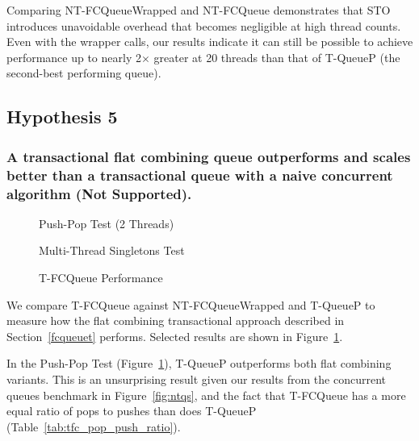 Comparing NT-FCQueueWrapped and NT-FCQueue demonstrates that STO introduces unavoidable overhead that becomes negligible at high thread counts. Even with the wrapper calls, our results indicate it can still be possible to achieve performance up to nearly 2$\times$ greater at 20 threads than that of T-QueueP (the second-best performing queue).

\vspace{12pt}
\noindent{}

\subsection{Hypothesis 5}
\subsubsection{A transactional flat combining queue outperforms and scales better than a transactional queue with a naive concurrent algorithm (Not Supported).}
\label{eval:hypo5}

\begin{figure}[ht!]
    \centering
	\begin{minipage}{0.75\textwidth}
        \caption*{Push-Pop Test (2 Threads)}
        \vspace{12pt}
	\end{minipage}
   	\begin{minipage}{0.75\textwidth}
        \caption*{Multi-Thread Singletons Test}
	\end{minipage}
        \caption{T-FCQueue Performance}
    \label{fig:tqs}
\end{figure}

We compare T-FCQueue against NT-FCQueueWrapped and T-QueueP to measure how the flat combining transactional approach described in Section~\ref{fcqueuet} performs. Selected results are shown in Figure~\ref{fig:tqs}.

In the Push-Pop Test (Figure~\ref{fig:tqs}), T-QueueP outperforms both flat combining variants. This is an unsurprising result given our results from the concurrent queues benchmark in Figure~\ref{fig:ntqs}, and the fact that T-FCQueue has a more equal ratio of pops to pushes than does T-QueueP (Table~\ref{tab:tfc_pop_push_ratio}). 

